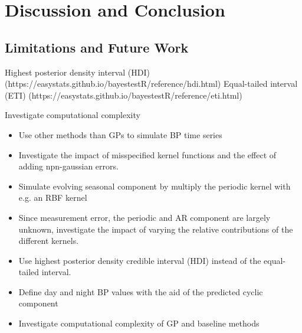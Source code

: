 \chapter{Discussion and Conclusion}\label{ch:discussion-and-conclusion}







\section{Limitations and Future Work}


    Highest posterior density interval (HDI) (https://easystats.github.io/bayestestR/reference/hdi.html)
    Equal-tailed interval (ETI) (https://easystats.github.io/bayestestR/reference/eti.html)


Investigate computational complexity

\begin{itemize}
    \item Use other methods than GPs to simulate BP time series
    \item Investigate the impact of misspecified kernel functions and the effect of adding npn-gaussian errors.
    \item Simulate evolving seasonal component by multiply the periodic kernel with e.g. an RBF kernel
    \item Since measurement error, the periodic and AR component are largely unknown,
    investigate the impact of varying the relative contributions of the different kernels.
    \item Use highest posterior density credible interval (HDI) instead of the equal-tailed interval.
    \item Define day and night BP values with the aid of the predicted cyclic component
    \item Investigate computational complexity of GP and baseline methods

\end{itemize}

